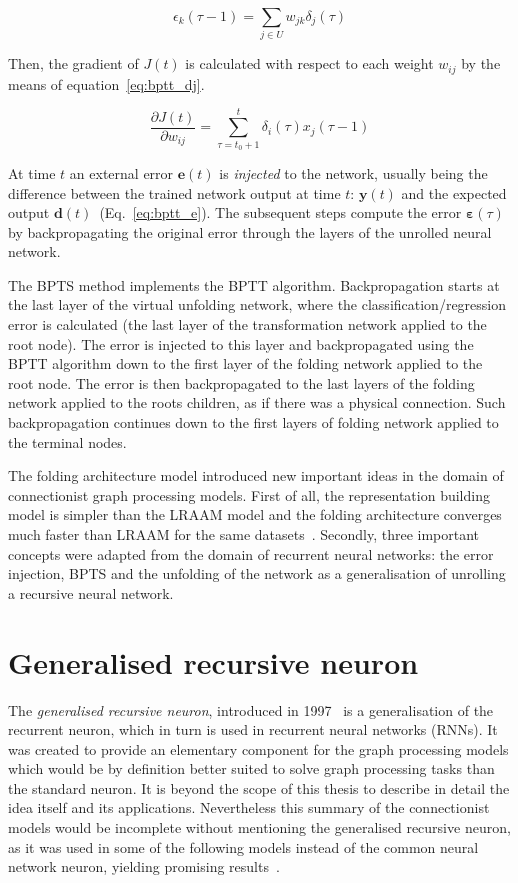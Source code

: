 \begin{equation}
\epsilon_k(\tau - 1) = \sum_{j \in U} w_{jk} \delta_j(\tau)
\label{eq:bptt_summaric}
\end{equation}

\noindent Then, the gradient of $J(t)$ is calculated with respect to each weight $w_{ij}$ by the means of equation~\ref{eq:bptt_dj}.

\begin{equation}
\frac{\partial J(t)}{\partial w_{ij}} = \sum_{\tau = t_0 + 1}^{t} \delta_i(\tau) x_j(\tau - 1)
\label{eq:bptt_dj}
\end{equation}

\noindent At time $t$ an external error $\bm{e}(t)$ is \emph{injected} to the network, usually being the difference between the trained network output at time $t$: $\bm{y}(t)$ and the expected output $\bm{d}(t)$~(Eq.~\ref{eq:bptt_e}). The subsequent steps compute the error $\bm{\varepsilon}(\tau)$ by backpropagating the original error through the layers of the unrolled neural network.

The BPTS method implements the BPTT algorithm. Backpropagation starts at the last layer of the virtual unfolding network, where the classification/regression error is calculated (the last layer of the transformation network applied to the root node). The error is injected to this layer and backpropagated using the BPTT algorithm down to the first layer of the folding network applied to the root node. The error is then backpropagated to the last layers of the folding network applied to the roots children, as if there was a physical connection. Such backpropagation continues down to the first layers of folding network applied to the terminal nodes.

The folding architecture model introduced new important ideas in the domain of connectionist graph processing models. First of all, the representation building model is simpler than the LRAAM model and the folding architecture converges much faster than LRAAM for the same datasets~\cite{goller1996learning}. Secondly, three important concepts were adapted from the domain of recurrent neural networks: the error injection, BPTS and the unfolding of the network as a generalisation of unrolling a recursive neural network.

\section{Generalised recursive neuron}
The \emph{generalised recursive neuron}, introduced in 1997~\cite{sperduti1997supervised} is a generalisation of the recurrent neuron, which in turn is used in recurrent neural networks (RNNs). It was created to provide an elementary component for the graph processing models which would be by definition better suited to solve graph processing tasks than the standard neuron. It is beyond the scope of this thesis to describe in detail the idea itself and its applications. Nevertheless this summary of the connectionist models would be incomplete without mentioning the generalised recursive neuron, as it was used in some of the following models instead of the common neural network neuron, yielding promising results~\cite{frasconi1998general}.

